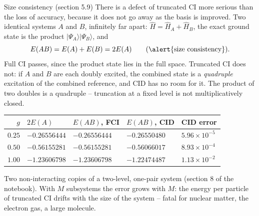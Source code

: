 \documentclass[aspectratio=169,10pt]{beamer}
\newcommand{\ket}[1]{\vert #1\rangle}
\begin{document}
\begin{frame}{Size consistency (section 5.9)}
  \footnotesize
  There is a defect of truncated CI more serious than the loss of accuracy, because it does not go away as the basis is improved. Two identical systems $A$ and $B$, infinitely far apart: $\hat{H}=\hat{H}_A+\hat{H}_B$, the exact ground state is the product $\ket{\Psi_A}\ket{\Psi_B}$, and
  \[
    E(AB)=E(A)+E(B)=2E(A)\qquad\text{(\alert{size consistency}).}
  \]
  Full CI passes, since the product state lies in the full space. Truncated CI does not: if $A$ and $B$ are each doubly excited, the combined state is a \emph{quadruple} excitation of the combined reference, and CID has no room for it. The product of two doubles is a quadruple -- truncation at a fixed level is not multiplicatively closed.
  \begin{center}
  \renewcommand{\arraystretch}{1.15}
  \begin{tabular}{rllll}
    \toprule
    $g$ & $2E(A)$ & $E(AB)$, FCI & $E(AB)$, CID & CID error\\
    \midrule
    $0.25$ & $-0.26556444$ & $-0.26556444$ & $-0.26550480$ & $5.96\times10^{-5}$\\
    $0.50$ & $-0.56155281$ & $-0.56155281$ & $-0.56066017$ & $8.93\times10^{-4}$\\
    $1.00$ & $-1.23606798$ & $-1.23606798$ & $-1.22474487$ & $1.13\times10^{-2}$\\
    \bottomrule
  \end{tabular}
  \end{center}
  Two non-interacting copies of a two-level, one-pair system (section 8 of the notebook). With $M$ subsystems the error grows with $M$: the energy per particle of truncated CI drifts with the size of the system -- fatal for nuclear matter, the electron gas, a large molecule.
\end{frame}
\end{document}
